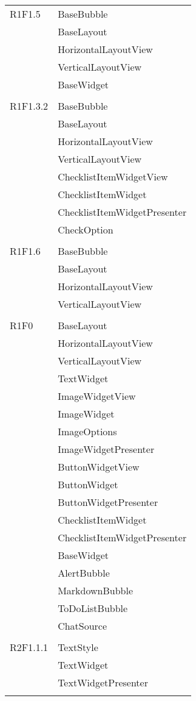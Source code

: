 \begin{center}
\begin{longtable}{|p{7cm}|p{7cm}|}
		R1F1.5 & BaseBubble \\ & BaseLayout \\ & HorizontalLayoutView \\ & VerticalLayoutView \\ & BaseWidget \\ & \\ \hline
		R1F1.3.2 & BaseBubble \\ & BaseLayout \\ & HorizontalLayoutView \\ & VerticalLayoutView \\ & ChecklistItemWidgetView \\ & ChecklistItemWidget \\ & ChecklistItemWidgetPresenter \\ & CheckOption \\ & \\ \hline
		R1F1.6 & BaseBubble \\ & BaseLayout \\ & HorizontalLayoutView \\ & VerticalLayoutView \\ & \\ \hline
		R1F0 & BaseLayout \\ & HorizontalLayoutView \\ & VerticalLayoutView \\ & TextWidget \\ & ImageWidgetView \\ & ImageWidget \\ & ImageOptions \\ & ImageWidgetPresenter \\ & ButtonWidgetView \\ & ButtonWidget \\ & ButtonWidgetPresenter \\ & ChecklistItemWidget \\ & ChecklistItemWidgetPresenter \\ & BaseWidget \\ & AlertBubble \\ & MarkdownBubble \\ & ToDoListBubble \\ & ChatSource \\ & \\ \hline
		R2F1.1.1 & TextStyle \\ & TextWidget \\ & TextWidgetPresenter \\ & \\ \hline

\end{longtable}
\end{center}
